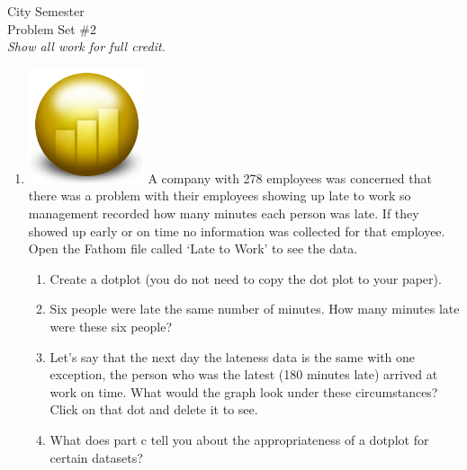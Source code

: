\documentclass[12pt]{article}
\theoremstyle{plain}     %
\begin{document}
\large
City Semester %
\\
Problem Set \#2\\
\normalsize 
\emph{Show all work for full credit.}\\
\begin{enumerate}
	\item \includegraphics[scale=.1]{fathom.png} A company with 278 employees was concerned that there was a problem with their employees showing up late to work so management recorded how many minutes each person was late.  If they showed up early or on time no information was collected for that employee.  Open the Fathom file called `Late to Work' to see the data.
	\begin{enumerate}
		\item Create a dotplot (you do not need to copy 		the dot plot to your paper).
		\item Six people were late the same number of 			minutes. How many minutes late were these six 			people?
		\item Let’s say that the next day the lateness 			data is the same with one exception, the person 		who was the latest (180 minutes late) arrived 			at work on time.  What would the graph look 				under these circumstances? Click on that dot 			and delete it to see.
		\item What does part c tell you about the 				appropriateness of a dotplot for certain datasets?  
	\end{enumerate}
	

\end{enumerate}
\end{document}
